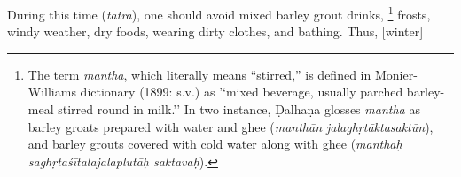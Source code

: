 \begin{translation}
%
%

\item[38] %
During this time (\emph{tatra}), one should avoid mixed barley grout drinks,%
	\footnote{The term \emph{mantha}, which literally means ``stirred,'' is defined in Monier-Williams dictionary (1899: s.v.) as '`mixed beverage, usually parched barley-meal stirred round in milk.'' In two instance, Ḍalhaṇa \citep[811 and 779]{vulgate} glosses \emph{mantha} as barley groats prepared with water and ghee (\emph{manthān jalaghṛtāktasaktūn}), and barley grouts covered with cold water along with ghee (\emph{manthaḥ saghṛtaśītalajalaplutāḥ saktavaḥ}).} %
%
frosts, windy weather, dry foods, wearing dirty clothes, and bathing. %
%
Thus, [winter]


\end{translation}
